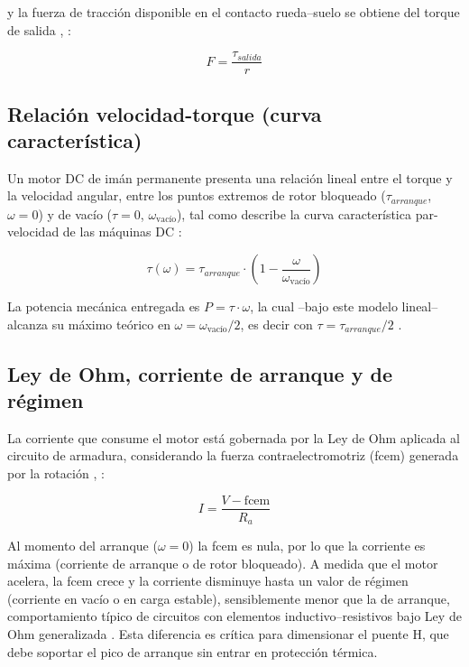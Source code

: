 \documentclass[journal]{IEEEtran}
\begin{document}
y la fuerza de tracción disponible en el contacto rueda--suelo se obtiene del torque de salida \cite{chapman}, \cite{norton}:

\begin{equation}
F = \frac{\tau_{salida}}{r}
\end{equation}

\subsection{Relación velocidad-torque (curva característica)}
Un motor DC de imán permanente presenta una relación lineal entre el torque y la velocidad angular, entre los puntos extremos de rotor bloqueado ($\tau_{arranque}$, $\omega=0$) y de vacío ($\tau=0$, $\omega_{\text{vacío}}$), tal como describe la curva característica par-velocidad de las máquinas DC \cite{chapman}:

\begin{equation}
\tau(\omega) = \tau_{arranque} \cdot \left(1 - \frac{\omega}{\omega_{\text{vacío}}}\right)
\end{equation}

La potencia mecánica entregada es $P = \tau \cdot \omega$, la cual --bajo este modelo lineal-- alcanza su máximo teórico en $\omega = \omega_{\text{vacío}}/2$, es decir con $\tau = \tau_{arranque}/2$ \cite{chapman}.

\subsection{Ley de Ohm, corriente de arranque y de régimen}
La corriente que consume el motor está gobernada por la Ley de Ohm aplicada al circuito de armadura, considerando la fuerza contraelectromotriz (fcem) generada por la rotación \cite{dorf}, \cite{nilsson}:

\begin{equation}
I = \frac{V - \text{fcem}}{R_a}
\end{equation}

Al momento del arranque ($\omega=0$) la fcem es nula, por lo que la corriente es máxima (corriente de arranque o de rotor bloqueado). A medida que el motor acelera, la fcem crece y la corriente disminuye hasta un valor de régimen (corriente en vacío o en carga estable), sensiblemente menor que la de arranque, comportamiento típico de circuitos con elementos inductivo--resistivos bajo Ley de Ohm generalizada \cite{dorf} \cite{nilsson}. Esta diferencia es crítica para dimensionar el puente H, que debe soportar el pico de arranque sin entrar en protección térmica.
 
\end{document}
